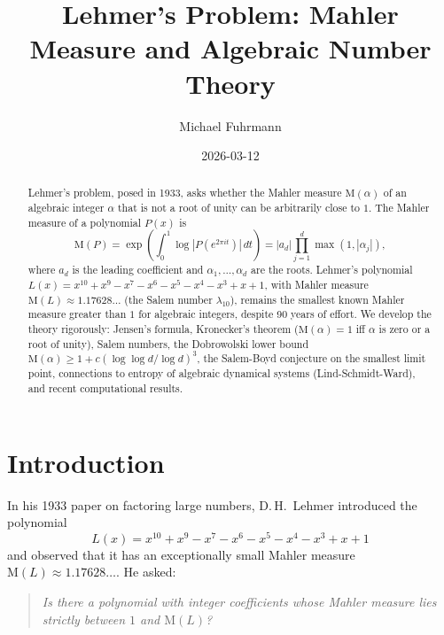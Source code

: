 \documentclass[12pt,a4paper]{amsart}
\theoremstyle{definition}
\theoremstyle{remark}
\newcommand{\M}{\mathrm{M}}
\begin{document}

\title{Lehmer's Problem: Mahler Measure and Algebraic Number Theory}

\author{Michael Fuhrmann}
\address{Specialist Mathematics Project, Build 167}
\date{2026-03-12}

\begin{abstract}
Lehmer's problem, posed in 1933, asks whether the Mahler measure $\M(\alpha)$ of an
algebraic integer $\alpha$ that is not a root of unity can be arbitrarily close to $1$.
The Mahler measure of a polynomial $P(x)$ is
\[
  \M(P) = \exp\!\left(\int_0^1 \log|P(e^{2\pi i t})|\,dt\right)
        = |a_d| \prod_{j=1}^d \max(1, |\alpha_j|),
\]
where $a_d$ is the leading coefficient and $\alpha_1,\ldots,\alpha_d$ are the roots.
Lehmer's polynomial $L(x) = x^{10}+x^9-x^7-x^6-x^5-x^4-x^3+x+1$, with Mahler measure
$\M(L) \approx 1.17628\ldots$ (the Salem number $\lambda_{10}$), remains the smallest
known Mahler measure greater than $1$ for algebraic integers, despite 90 years of effort.
We develop the theory rigorously: Jensen's formula, Kronecker's theorem ($\M(\alpha)=1$
iff $\alpha$ is zero or a root of unity), Salem numbers, the
Dobrowolski lower bound $\M(\alpha) \geq 1 + c(\log\log d/\log d)^3$, the
Salem-Boyd conjecture on the smallest limit point, connections to entropy of algebraic
dynamical systems (Lind-Schmidt-Ward), and recent computational results.
\end{abstract}

\maketitle

\tableofcontents

\section{Introduction}

In his 1933 paper \cite{Lehmer1933} on factoring large numbers, D.\,H.\ Lehmer introduced
the polynomial
\[
  L(x) = x^{10}+x^9-x^7-x^6-x^5-x^4-x^3+x+1
\]
and observed that it has an exceptionally small Mahler measure
$\M(L) \approx 1.17628\ldots$.
He asked:
\begin{quote}
  \textit{Is there a polynomial with integer coefficients whose Mahler measure lies strictly
  between $1$ and $\M(L)$?}
\end{quote}
\end{document}

